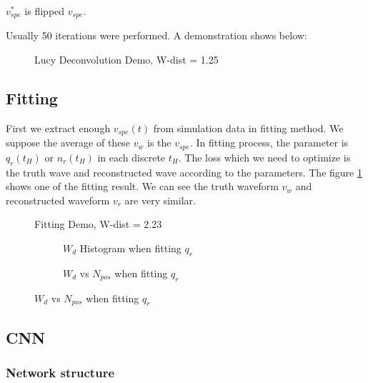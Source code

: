 $v^{*}_{spe}$ is flipped $v_{spe}$. 

Usually 50 iterations were performed. A demonstration shows below: 

\begin{figure}[H]
    \centering
    \scalebox{0.4}{}
    \caption{Lucy Deconvolution Demo, W-dist = 1.25}
\end{figure}

\subsection{Fitting}
First we extract enough $v_{spe}(t)$ from simulation data in fitting method. We suppose the average of these $v_{w}$ is the $v_{spe}$. In fitting process, the parameter is $q_{r}(t_{H})$ or $n_{r}(t_{H})$ in each discrete $t_{H}$. The loss which we need to optimize is the truth wave and reconstructed wave according to the parameters. The figure \ref{fig:fitting} shows one of the fitting result. We can see the truth waveform $v_{w}$ and reconstructed waveform $v_{r}$ are very similar. 

\begin{figure}[H]
    \centering
    \scalebox{0.4}{}
    \caption{\label{fig:fitting} Fitting Demo, W-dist = 2.23}
\end{figure}

\begin{figure}[H]
    \begin{subfigure}{0.5\textwidth}
        \centering
        \scalebox{0.4}{}
        \caption{$W_{d}$ Histogram when fitting $q_{r}$}
    \end{subfigure}
    \begin{subfigure}{0.5\textwidth}
        \centering
        \scalebox{0.4}{}
        \caption{$W_{d}$ vs $N_{pos}$ when fitting $q_{r}$}
    \end{subfigure}
\end{figure}

\subsection{CNN}

\subsubsection{Network structure}

